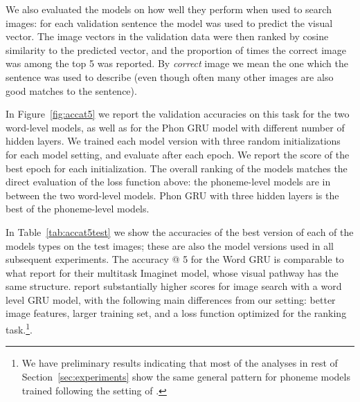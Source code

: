 We also evaluated the models on how well they perform when used to
search images: for each validation sentence the model was used to predict the
visual vector. The image vectors in the validation data were then
ranked by cosine similarity to the predicted vector, and the
proportion of times the correct image was among the top 5 was
reported. By {\it correct} image we mean the one which the sentence
was used to describe (even though often many other images are also
good matches to the sentence). 

In Figure~\ref{fig:accat5} we report the validation accuracies on this
task for the two word-level models, as well as for the Phon GRU
model with different number of hidden layers. We trained each model
version with three random initializations for each model setting, and
evaluate after each epoch. We report the score of the best epoch for
each initialization. 
The overall ranking of the models matches the direct
evaluation of the loss function above: the phoneme-level models are in
between the two word-level models. {\sc Phon GRU} with three
hidden layers is the best of the phoneme-level models.

In Table~\ref{tab:accat5test} we show the accuracies of the best
version of each of the models types on the test images; these are also
the model versions used in all subsequent experiments. The accuracy @
5 for the {\sc Word GRU} is comparable to what
 report for their multitask {\sc
  Imaginet} model, whose visual pathway has the same
structure.  report substantially higher
scores for image search with a word level GRU model, with the
following main differences from our setting: better image features,
larger training set, and a loss function optimized for the ranking
task.\footnote{We have preliminary results indicating that most of the
  analyses in rest of Section~\ref{sec:experiments} show the same general
  pattern for phoneme models trained following the setting of
  .}.


